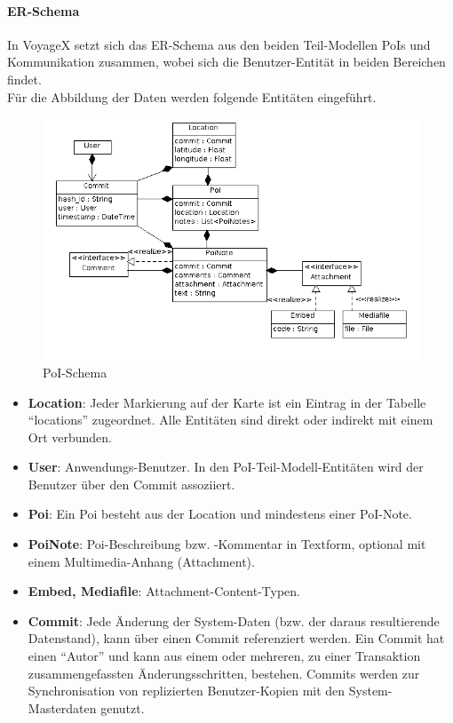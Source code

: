 \paragraph{ER-Schema}
In VoyageX setzt sich das ER-Schema aus den beiden Teil-Modellen PoIs und Kommunikation zusammen, wobei sich die Benutzer-Entität in beiden Bereichen findet.\\
Für die Abbildung der Daten werden folgende Entitäten eingeführt.
  \begin{figure}[H]
      \centering
	  \includegraphics[scale=0.6]{bilder/uml/er_poi.png}
  	  \caption{PoI-Schema}
  \end{figure}
\begin{itemize}[leftmargin=*,noitemsep,topsep=1ex,parsep=0pt,partopsep=0pt]
\item \textbf{Location}: Jeder Markierung auf der Karte ist ein Eintrag in der Tabelle "`locations"' zugeordnet. Alle Entitäten sind direkt oder indirekt mit einem Ort verbunden.
\item \textbf{User}: Anwendungs-Benutzer. In den PoI-Teil-Modell-Entitäten wird der Benutzer über den Commit assoziiert.
\item \textbf{Poi}: Ein Poi besteht aus der Location und mindestens einer PoI-Note.
\item \textbf{PoiNote}: Poi-Beschreibung bzw. -Kommentar in Textform, optional mit einem Multimedia-Anhang (Attachment).
\item \textbf{Embed, Mediafile}: Attachment-Content-Typen.
\item \textbf{Commit}: Jede Änderung der System-Daten (bzw. der daraus resultierende Datenstand), kann über einen Commit referenziert werden. Ein Commit hat einen "`Autor"' und kann aus einem oder mehreren, zu einer Transaktion zusammengefassten Änderungsschritten, bestehen. Commits werden zur Synchronisation von replizierten Benutzer-Kopien mit den System-Masterdaten genutzt. 
\end{itemize}
